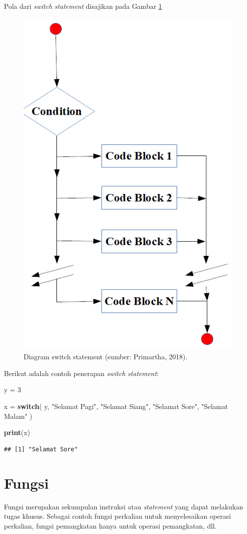\documentclass[]{book}
\newenvironment{Shaded}{\begin{snugshade}}{\end{snugshade}}
\newcommand{\ControlFlowTok}[1]{\textcolor[rgb]{0.13,0.29,0.53}{\textbf{#1}}}
\newcommand{\DecValTok}[1]{\textcolor[rgb]{0.00,0.00,0.81}{#1}}
\newcommand{\KeywordTok}[1]{\textcolor[rgb]{0.13,0.29,0.53}{\textbf{#1}}}
\newcommand{\NormalTok}[1]{#1}
\newcommand{\StringTok}[1]{\textcolor[rgb]{0.31,0.60,0.02}{#1}}
\theoremstyle{definition}
\theoremstyle{definition}
\theoremstyle{definition}
\theoremstyle{remark}
\begin{document}
Pola dari \emph{switch statement} disajikan pada Gambar \ref{fig:switch}

\begin{figure}

{\centering \includegraphics[width=0.4\linewidth]{./images/switch} 

}

\caption{Diagram switch statement (sumber: Primartha, 2018).}\label{fig:switch}
\end{figure}

Berikut adalah contoh penerapan \emph{switch statement}:

\begin{Shaded}
\begin{Highlighting}[]
\NormalTok{y =}\StringTok{ }\DecValTok{3}

\NormalTok{x =}\StringTok{ }\ControlFlowTok{switch}\NormalTok{(}
\NormalTok{  y,}
  \StringTok{"Selamat Pagi"}\NormalTok{,}
  \StringTok{"Selamat Siang"}\NormalTok{,}
  \StringTok{"Selamat Sore"}\NormalTok{,}
  \StringTok{"Selamat Malam"}
\NormalTok{)}

\KeywordTok{print}\NormalTok{(x)}
\end{Highlighting}
\end{Shaded}

\begin{verbatim}
## [1] "Selamat Sore"
\end{verbatim}

\hypertarget{fungsi}{%
\section{Fungsi}\label{fungsi}}

Fungsi merupakan sekumpulan instruksi atau \emph{statement} yang dapat melakukan tugas khusus. Sebagai contoh fungsi perkalian untuk menyelesaikan operasi perkalian, fungsi pemangkatan hanya untuk operasi pemangkatan, dll.
\end{document}

